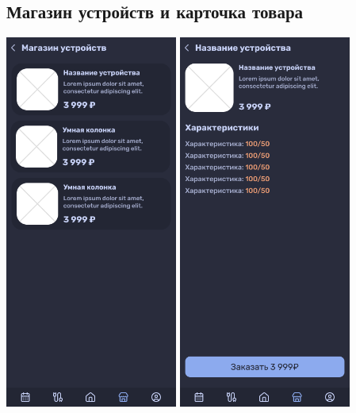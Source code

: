 \documentclass[a4paper,12pt]{article}
\begin{document}
\subsection*{Магазин устройств и карточка товара}
\begin{center}
  \includegraphics[width=0.425\textwidth]{pics/Store Page.png}
  \includegraphics[width=0.425\textwidth]{pics/Single Store Page.png}
\end{center}
\end{document}

